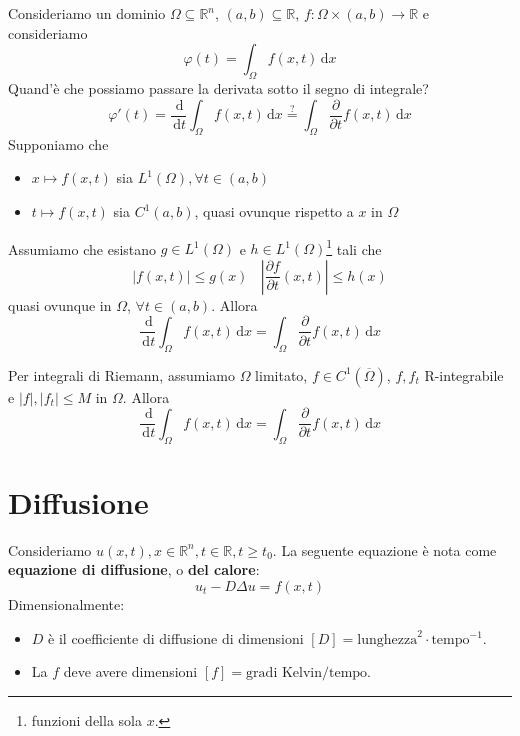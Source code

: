 \documentclass[10pt,a4paper,twoside,openright]{book}
\newcommand{\de}{\,\mathrm d}
\newcommand{\dx}{\de x}
\newcommand{\dt}{\de t}
\begin{document}
Consideriamo un dominio $\Omega \subseteq \mathbb{R}^{n}$, $(a,b) \subseteq \mathbb{R}$, $f:\Omega \times (a,b)\rightarrow \mathbb{R}$ e consideriamo
\begin{equation*}
\varphi (t) =\int _{\Omega } f(x,t) \dx
\end{equation*}
Quand'è che possiamo passare la derivata sotto il segno di integrale?
\begin{equation*}
\varphi '(t) =\frac{\de}{\dt}\int _{\Omega } f(x,t) \dx\overset{?}{=}\int _{\Omega }\frac{\partial }{\partial t} f(x,t) \dx
\end{equation*}
Supponiamo che
\begin{itemize}
\item $\displaystyle x\mapsto f(x,t)$ sia $\displaystyle L^{1}(\Omega),\forall t\in (a,b)$
\item $\displaystyle t\mapsto f(x,t)$ sia $\displaystyle C^{1}(a,b)$, quasi ovunque rispetto a $x$ in $\displaystyle \Omega $
\end{itemize}
\begin{theorem}
Assumiamo che esistano $g\in L^{1}(\Omega)$ e $h\in L^{1}(\Omega)$\footnote{funzioni della sola $x$.} tali che
\begin{equation*}
| f(x,t)| \leqslant g(x) \ \ \ \ \left| \frac{\partial f}{\partial t}(x,t)\right| \leqslant h(x)
\end{equation*}
quasi ovunque in $\displaystyle \Omega $, $\displaystyle \forall t\in (a,b)$. Allora
\begin{equation*}
\frac{\de}{\dt}\int _{\Omega } f(x,t) \dx=\int _{\Omega }\frac{\partial }{\partial t} f(x,t) \dx
\end{equation*}
\end{theorem}
Per integrali di Riemann, assumiamo $\Omega $ limitato, $f\in C^{1}(\overline{\Omega })$, $f,f_{t}$ R-integrabile e $| f|,| f_{t}| \leqslant M$ in $\Omega $. Allora
\begin{equation*}
\frac{\de}{\dt}\int _{\Omega } f(x,t) \dx=\int _{\Omega }\frac{\partial }{\partial t} f(x,t) \dx
\end{equation*}
\chapter{Diffusione}

Consideriamo $u(x,t),x\in \mathbb{R}^{n},t\in \mathbb{R},t\geqslant t_{0}$. La seguente equazione è nota come \textbf{equazione di diffusione}, o \textbf{del calore}:
\begin{equation*}
\boxed{u_{t} -D\Delta u=f(x,t)}
\end{equation*}
Dimensionalmente:
\begin{itemize}
\item $D$ è il coefficiente di diffusione di dimensioni $[ D] =\text{lunghezza}^{2} \cdotp \text{tempo}^{-1}$.
\item La $f$ deve avere dimensioni $[ f] =\text{gradi Kelvin} /\text{tempo}$.
\end{itemize}
\end{document}
